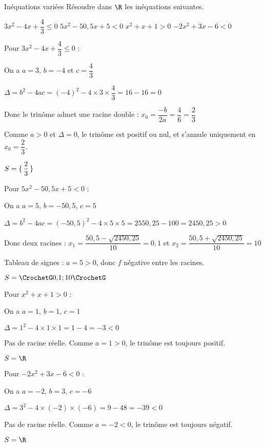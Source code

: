 \def\rdifficulty{2}
\begin{EXO}{Inéquations variées}{}
Résoudre dans $\R$ les inéquations suivantes.
\begin{tcbenumerate}[4]
\tcbitem {} $3x^2-4x+\dfrac{4}{3}\leqslant 0$
\tcbitem {} $5x^2-50,5x+5<0$
\tcbitem {} $x^2+x+1>0$
\tcbitem {} $-2x^2+3x-6<0$\\
\end{tcbenumerate}

\exocorrection

\begin{tcbenumerate}[1]
\tcbitem Pour $3x^2-4x+\dfrac{4}{3}\leqslant 0$ :

On a $a=3$, $b=-4$ et $c=\dfrac{4}{3}$

$\Delta = b^2-4ac = (-4)^2-4\times3\times\dfrac{4}{3} = 16-16 = 0$

Donc le trinôme admet une racine double : $x_0 = \dfrac{-b}{2a} = \dfrac{4}{6} = \dfrac{2}{3}$

Comme $a>0$ et $\Delta=0$, le trinôme est positif ou nul, et s'annule uniquement en $x_0=\dfrac{2}{3}$.

$S = \ensembleDiscret{\dfrac{2}{3}}$

\tcbitem Pour $5x^2-50{,}5x+5<0$ :

On a $a=5$, $b=-50{,}5$, $c=5$

$\Delta = b^2-4ac = (-50{,}5)^2-4\times5\times5 = 2550{,}25-100 = 2450{,}25 > 0$

Donc deux racines : $x_1 = \dfrac{50{,}5-\sqrt{2450{,}25}}{10} = 0{,}1$ et $x_2 = \dfrac{50{,}5+\sqrt{2450{,}25}}{10} = 10$

Tableau de signes : $a=5>0$, donc $f$ négative entre les racines.

$S = \CrochetG 0{,}1 ; 10 \CrochetG$

\tcbitem Pour $x^2+x+1>0$ :

On a $a=1$, $b=1$, $c=1$

$\Delta = 1^2-4\times1\times1 = 1-4 = -3 < 0$

Pas de racine réelle. Comme $a=1>0$, le trinôme est toujours positif.

$S = \R$

\tcbitem Pour $-2x^2+3x-6<0$ :

On a $a=-2$, $b=3$, $c=-6$

$\Delta = 3^2-4\times(-2)\times(-6) = 9-48 = -39 < 0$

Pas de racine réelle. Comme $a=-2<0$, le trinôme est toujours négatif.

$S = \R$
\end{tcbenumerate}
\end{EXO}

